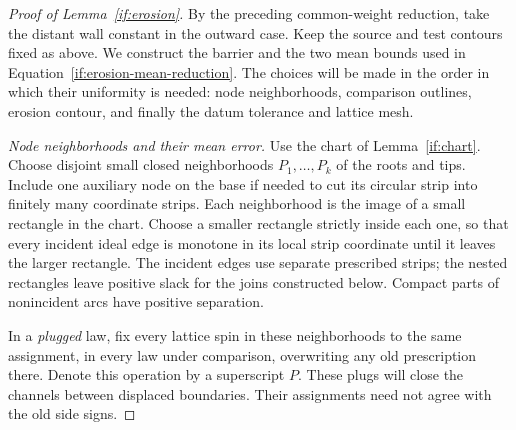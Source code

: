 \begin{proof}[Proof of Lemma~\ref{if:erosion}]
By the preceding common-weight reduction, take the distant wall
constant in the outward case. Keep the source and test contours fixed
as above. We construct the barrier and the two mean bounds used in
Equation~\eqref{if:erosion-mean-reduction}. The choices will be made in
the order in which their uniformity is needed: node neighborhoods,
comparison outlines, erosion contour, and finally the datum tolerance
and lattice mesh.

\emph{Node neighborhoods and their mean error.}
Use the chart of Lemma~\ref{if:chart}. Choose disjoint small closed
neighborhoods $P_1,\ldots,P_k$ of the roots and tips. Include one
auxiliary node on the base if needed to cut its circular strip into
finitely many coordinate strips. Each neighborhood is the image of
a small rectangle in the chart. Choose a smaller rectangle strictly
inside each one, so that every incident ideal edge is monotone in
its local strip coordinate until it leaves the larger rectangle.
The incident edges use separate prescribed strips; the nested
rectangles leave positive slack for the joins constructed below.
Compact parts of nonincident arcs have positive separation.

In a \emph{plugged} law, fix every lattice spin in these neighborhoods
to the same assignment, in every law under comparison, overwriting
any old prescription there. Denote this operation by a superscript
$P$. These plugs will close the channels between displaced boundaries.
Their assignments need not agree with the old side signs.


\end{proof}
